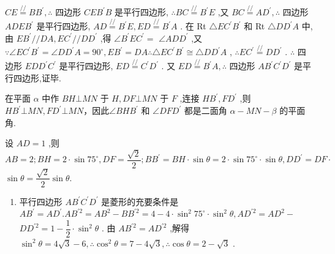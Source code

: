 \begin{enumerate}
\begin{jieda}
        ${CE}\overset{//}{=} {BB}^{\prime },\therefore$ 四边形 ${CE}{B}^{\prime }B$ 是平行四边形, $\therefore {BC}\overset{//}{=} B^{\prime }E$ ,又 ${BC}\overset{//}{=} {AD}^{\prime },\therefore$ 四边形 ${ADE}{B}^{\prime }$ 是平行四边形, ${AD} \overset{//}{=}  {B}^{\prime }E,{ED} \overset{//}{=} {B}^{\prime }A$ . 在 Rt $\bigtriangleup  E{C}^{\prime }{B}^{\prime }$ 和 Rt $\bigtriangleup  D{D}^{\prime }A$ 中,由 $E{B}^{\prime }//{DA},E{C}^{\prime }//D{D}^{\prime }$ ,得 $\angle {B}^{\prime }E{C}^{\prime } =$  $\angle {AD}{D}^{\prime }$ ,又 $\because \angle E{C}^{\prime }{B}^{\prime } = \angle D{D}^{\prime }A = {90}^{ \circ  },E{B}^{\prime } = {DA}\therefore \bigtriangleup E{C}^{\prime }{B}^{\prime } \cong  \bigtriangleup D{D}^{\prime }A$ , $\therefore E{C}^{\prime } \overset{//}{=} D{D}^{\prime }$ . $\therefore$ 四边形 ${ED}{D}^{\prime }{C}^{\prime }$ 是平行四边形, ${ED}\overset{//}{ = }{C}^{\prime }{D}^{\prime }$ . 又 ${ED}\overset{//}{ = }{B}^{\prime }A,\therefore$ 四边形 $A{B}^{\prime }{C}^{\prime }{D}^{\prime }$ 是平行四边形,证毕.
        
        在平面 $\alpha$ 中作 ${BH} \bot  {MN}$ 于 $H,{DF} \bot  {MN}$ 于 $F$ ,连接 $H{B}^{\prime },F{D}^{\prime }$ ,则 $H{B}^{\prime } \bot  {MN},F{D}^{\prime } \bot  {MN}$，因此$\angle {BH}{B}^{\prime }$ 和 $\angle {DF}{D}^{\prime }$ 都是二面角 $\alpha  - {MN} - \beta$ 的平面角. 
        
        设 ${AD} = 1$ ,则 ${AB} = 2;{BH} = 2 \cdot  \sin {75}^{ \circ  },{DF} = \dfrac{\sqrt{2}}{2};B{B}^{\prime } = {BH} \cdot  \sin \theta  = 2 \cdot  \sin {75}^{ \circ  } \cdot  \sin \theta ,D{D}^{\prime } = {DF} \cdot$  $\sin \theta  = \dfrac{\sqrt{2}}{2}\sin \theta .$
        \begin{enumerate}
            \item 平行四边形 $A{B}^{\prime }{C}^{\prime }{D}^{\prime }$ 是菱形的充要条件是 $A{B}^{\prime } = A{D}^{\prime }.A{B}^{\prime 2} = A{B}^{2} - B{B}^{\prime 2} = 4 - 4 \cdot  {\sin }^{2}{75}^{ \circ  } \cdot  {\sin }^{2}\theta ,A{D}^{\prime 2} = A{D}^{2} -$  $D{D}^{\prime 2} = 1 - \dfrac{1}{2} \cdot  {\sin }^{2}\theta$ . 由 $A{B}^{\prime 2} = A{D}^{\prime 2}$ ,解得 ${\sin }^{2}\theta  = 4\sqrt{3} - 6,\therefore {\cos }^{2}\theta  = 7 - 4\sqrt{3},\therefore \cos \theta  = 2 - \sqrt{3}$ .
            

\end{enumerate}
\end{jieda}
\end{enumerate}
